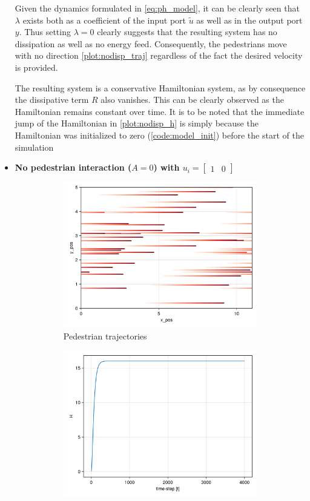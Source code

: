 \begin{itemize}
Given the dynamics formulated in \autoref{eq:ph_model}, it can be clearly seen that $\lambda$ exists both as a coefficient of the input port $\tilde u$ as well as in the output port $y$. Thus setting $\lambda = 0$ clearly suggests that the resulting system has no dissipation as well as no energy feed. Consequently, the pedestrians move with no direction \autoref{plot:nodisp_traj} regardless of the fact the desired velocity is provided.

The resulting system is a conservative Hamiltonian system, as by consequence the dissipative term $R$ also vanishes. This can be clearly observed as the Hamiltonian remains constant over time. It is to be noted that the immediate jump of the Hamiltonian in \autoref{plot:nodisp_h} is simply because the Hamiltonian was initialized to zero (\autoref{code:model_init}) before the start of the simulation
\pagebreak
\item \textbf{No pedestrian interaction ($A = 0$) with $u_i = \begin{bmatrix} 1 & 0 \end{bmatrix}$}
\begin{figure}[H]
    \centering
    \begin{subfigure}{\textwidth}
        \centering
        \includegraphics[width=0.6\linewidth]{figures/no_interactiondflow_4000.png}
        \caption{Pedestrian trajectories}
        \label{plot:nointeraction_traj}
    \end{subfigure}
    \begin{subfigure}{.40\textwidth}
        \centering
        \includegraphics[width=\linewidth]{figures/H_no_interaction.png}

\end{subfigure}
\end{figure}
\end{itemize}
